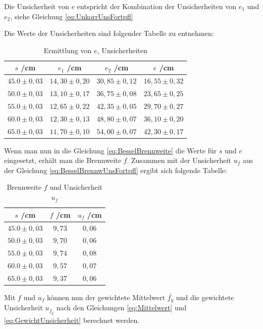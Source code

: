 \documentclass[a4paper,12pt]{article}
\begin{document}
Die Unsicherheit von $e$ entspricht der Kombination der Unsicherheiten von $e_1$ und $e_2$, siehe Gleichung \ref{eq:UnkorrUnsFortpfl}

Die Werte der Unsicherheiten sind folgender Tabelle zu entnehmen:

\begin{table}[H]
	\centering
	\begin{tabular}{c|c|c|c}
		$s$ /cm & $e_1$ /cm & $e_2$ /cm & $e$ /cm \\ \hline
		$45.0\pm0,03$ & $14,30\pm0,20$ & $30,85\pm0,12$ & $16,55\pm0,32$ \\
		$50.0\pm0,03$ & $13,10\pm0,17$ & $36,75\pm0,08$ & $23,65\pm0,25$ \\
		$55.0\pm0,03$ & $12,65\pm0,22$ & $42,35\pm0,05$ & $29,70\pm0,27$ \\
		$60.0\pm0,03$ & $12,30\pm0,13$ & $48,80\pm0,07$ & $36,10\pm0,20$ \\
		$65.0\pm0,03$ & $11,70\pm0,10$ & $54,00\pm0,07$ & $42,30\pm0,17$ \\
	\end{tabular}
    \caption{Ermittlung von $e$, Unsicherheiten}
\end{table}

Wenn man nun in die Gleichung \ref{eq:BesselBrennweite} die Werte für $s$ und $e$ eingesetzt, erhält man die Brennweite $f$.
Zusammen mit der Unsicherheit $u_f$ aus der Gleichung \ref{eq:BesselBrennwUnsFortpfl} ergibt sich folgende Tabelle:

\begin{table}[H]
    \centering
    \begin{tabular}{c|c|c}
        $s$ /cm & $f$ /cm & $u_f$ /cm \\ \hline
        $45.0\pm0,03$ & $9,73$ & $0,06$ \\
        $50.0\pm0,03$ & $9,70$ & $0,06$ \\
        $55.0\pm0,03$ & $9,74$ & $0,08$ \\
        $60.0\pm0,03$ & $9,57$ & $0,07$ \\
        $65.0\pm0,03$ & $9,37$ & $0,06$ \\
    \end{tabular}
    \caption{Brennweite $f$ und Unsicherheit $u_f$}
\end{table}

Mit $f$ und $u_f$ können nun der gewichtete Mittelwert $\bar{f_g}$ und die gewichtete Unsicherheit $u_{\bar{f_g}}$
nach den Gleichungen \ref{eq:Mittelwert} und \ref{eq:GewichtUnsicherheit} berechnet werden.
\end{document}
